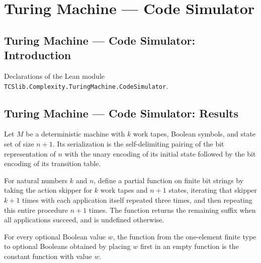 \section{Turing Machine --- Code Simulator}
\subsection*{Turing Machine --- Code Simulator: Introduction}

Declarations of the Lean module \texttt{TCSlib.Complexity.TuringMachine.CodeSimulator}.

\subsection*{Turing Machine --- Code Simulator: Results}

\begin{definition}
\label{Turing.serializeK}
\leanok
{}
Let $M$ be a deterministic machine with $k$ work tapes, Boolean symbols, and state set
of size $n+1$. Its serialization is the self-delimiting pairing of the bit
representation of $n$ with the unary encoding of its initial state followed by the bit
encoding of its transition table.
\end{definition}

\begin{definition}
\label{Turing.codeSkipTableK}
\leanok
{}
For natural numbers $k$ and $n$, define a partial function on finite bit strings by
taking the action skipper for $k$ work tapes and $n+1$ states, iterating that skipper
$k+1$ times with each application itself repeated three times, and then repeating this
entire procedure $n+1$ times. The function returns the remaining suffix when all
applications succeed, and is undefined otherwise.
\end{definition}

\begin{lemma}
\label{Turing.fin_cons_one}
\leanok
{}
For every optional Boolean value $w$, the function from the one-element finite type to
optional Booleans obtained by placing $w$ first in an empty function is the constant
function with value $w$.
\end{lemma}


